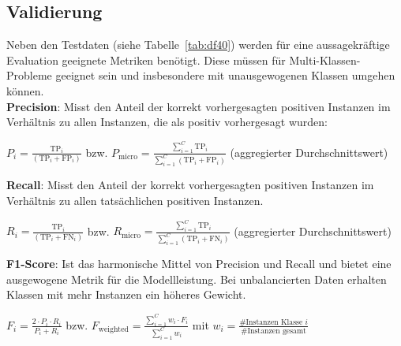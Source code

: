 \documentclass{article}
\begin{document}
\subsection{Validierung}\label{ssec:validation}
Neben den Testdaten (siehe Tabelle~\ref{tab:df40}) werden für eine aussagekräftige Evaluation geeignete Metriken benötigt.
Diese müssen für Multi-Klassen-Probleme geeignet sein und insbesondere mit unausgewogenen Klassen umgehen können.
\\[0.5em]
\textbf{Precision}: Misst den Anteil der korrekt vorhergesagten positiven Instanzen im Verhältnis zu allen Instanzen, die als positiv vorhergesagt wurden:
    \begin{center}
        $\displaystyle P_i=\frac{\text{TP}_i}{(\text{TP}_i+\text{FP}_i)}$ bzw. $\displaystyle P_\text{micro}=\frac{\sum_{i=1}^C\text{TP}_i}{\sum_{i=1}^C(\text{TP}_i+\text{FP}_i)}$ (aggregierter Durchschnittswert)
    \end{center}
\textbf{Recall}: Misst den Anteil der korrekt vorhergesagten positiven Instanzen im Verhältnis zu allen tatsächlichen positiven Instanzen.
    \begin{center}
        $\displaystyle R_i=\frac{\text{TP}_i}{(\text{TP}_i+\text{FN}_i)}$ bzw. $\displaystyle R_\text{micro}=\frac{\sum_{i=1}^C\text{TP}_i}{\sum_{i=1}^C(\text{TP}_i+\text{FN}_i)}$ (aggregierter Durchschnittswert)
    \end{center}
\textbf{F1-Score}: Ist das harmonische Mittel von Precision und Recall und bietet eine ausgewogene Metrik für die Modellleistung. Bei unbalancierten Daten erhalten Klassen mit mehr Instanzen ein höheres Gewicht.
    \begin{center}
        $\displaystyle F_i=\frac{2\cdot P_i\cdot R_i}{P_i+R_i}$ bzw. $\displaystyle F_\text{weighted}=\frac{\sum_{i=1}^Cw_i\cdot F_i}{\sum_{i=1}^Cw_i}$ mit $w_i=\frac{\text{\#Instanzen Klasse }i}{\text{\#Instanzen gesamt}}$
    \end{center}
\end{document}
